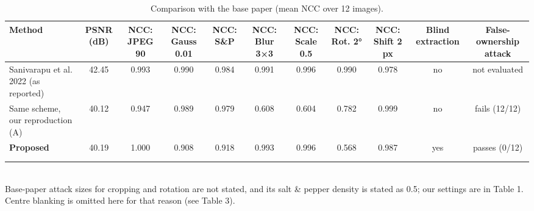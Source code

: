 \begin{table}[t]
\centering
\small
\caption{Comparison with the base paper (mean NCC over 12 images).}
\begin{tabular}{lcccccccccc}
\toprule
Method & PSNR (dB) & NCC: JPEG 90 & NCC: Gauss 0.01 & NCC: S\&P & NCC: Blur 3×3 & NCC: Scale 0.5 & NCC: Rot. 2° & NCC: Shift 2 px & Blind extraction & False-ownership attack \\
\midrule
Sanivarapu et al. 2022 (as reported) & 42.45 & 0.993 & 0.990 & 0.984 & 0.991 & 0.996 & 0.990 & 0.978 & no & not evaluated \\
Same scheme, our reproduction (A) & 40.12 & 0.947 & 0.989 & 0.979 & 0.608 & 0.604 & 0.782 & 0.999 & no & fails (12/12) \\
\textbf{Proposed} & 40.19 & 1.000 & 0.908 & 0.918 & 0.993 & 0.996 & 0.568 & 0.987 & yes & passes (0/12) \\
[Paper 2 — to add] &  &  &  &  &  &  &  &  &  &  \\
[Paper 3 — to add] &  &  &  &  &  &  &  &  &  &  \\
\bottomrule
\end{tabular}
\\[2pt]\footnotesize Base-paper attack sizes for cropping and rotation are not stated, and its salt & pepper density is stated as 0.5; our settings are in Table 1. Centre blanking is omitted here for that reason (see Table 3).
\end{table}
